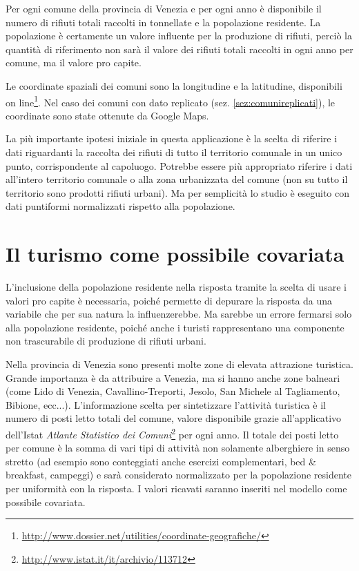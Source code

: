 \documentclass[a4paper,11pt,twoside,openright]{book}							%
\begin{document}
Per ogni comune della provincia di Venezia e per ogni anno è disponibile il numero di rifiuti totali raccolti in tonnellate e la popolazione residente. La popolazione è certamente un valore influente per la produzione di rifiuti, perciò la quantità di riferimento non sarà il valore dei rifiuti totali raccolti in ogni anno per comune, ma il valore pro capite.

Le coordinate spaziali dei comuni sono la longitudine e la latitudine, disponibili on line\footnote{\href{http://www.dossier.net/utilities/coordinate-geografiche/}{http://www.dossier.net/utilities/coordinate-geografiche/}}. Nel caso dei comuni con dato replicato (sez. \ref{sez:comunireplicati}), le coordinate sono state ottenute da Google Maps.

La più importante ipotesi iniziale in questa applicazione è la scelta di riferire i dati riguardanti la raccolta dei rifiuti di tutto il territorio comunale in un unico punto, corrispondente al capoluogo. Potrebbe essere più appropriato riferire i dati all'intero territorio comunale o alla zona urbanizzata del comune (non su tutto il territorio sono prodotti rifiuti urbani). Ma per semplicità lo studio è eseguito con dati puntiformi normalizzati rispetto alla popolazione. 

\section{Il turismo come possibile covariata}

L'inclusione della popolazione residente nella risposta tramite la scelta di usare i valori pro capite è necessaria, poiché permette di depurare la risposta da una variabile che per sua natura la influenzerebbe. Ma sarebbe un errore fermarsi solo alla popolazione residente, poiché anche i turisti rappresentano una componente non trascurabile di produzione di rifiuti urbani.

Nella provincia di Venezia sono presenti molte zone di elevata attrazione turistica. Grande importanza è da attribuire a Venezia, ma si hanno anche zone balneari (come Lido di Venezia, Cavallino-Treporti, Jesolo, San Michele al Tagliamento, Bibione, ecc...). L'informazione scelta per sintetizzare l'attività turistica è il numero di posti letto totali del comune, valore disponibile grazie all'applicativo dell'Istat \textit{Atlante Statistico dei Comuni}\footnote{\href{http://www.istat.it/it/archivio/113712}{http://www.istat.it/it/archivio/113712}} per ogni anno. Il totale dei posti letto per comune è la somma di vari tipi di attività non solamente alberghiere in senso stretto (ad esempio sono conteggiati anche esercizi complementari, bed \& breakfast, campeggi) e sarà considerato normalizzato per la popolazione residente per uniformità con la risposta. I valori ricavati saranno inseriti nel modello come possibile covariata.
\end{document}
